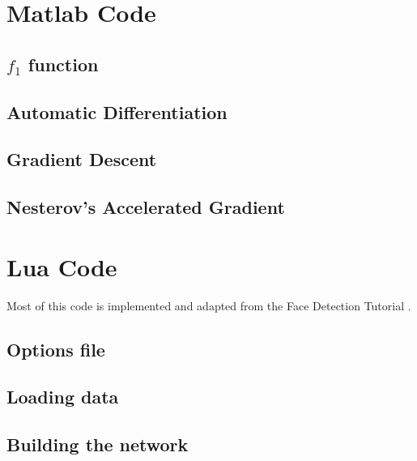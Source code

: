 \documentclass[titlepage]{article}
\theoremstyle{plain}
\theoremstyle{definition}
\begin{document}
	\newpage
	\section{Matlab Code} \label{MatlabCode}
	\lstset{style=matlabStyle}
		\subsection{$f_1$ function} \label{f1code}
		
		\subsection{Automatic Differentiation} \label{AutoDiffCode}
		
		\subsection{Gradient Descent} \label{sgdCode}
		
		\subsection{Nesterov's Accelerated Gradient} \label{nagCode}
		
		\newpage
	\section{Lua Code} \label{luaCode}
	\lstset{style=luaStyle}
	\lstset{inputpath="/home/iosu/workspace/Deep Learning/src/"}
	Most of this code is implemented and adapted from the Face Detection Tutorial \cite{torchCodeSource}.
		\subsection{Options file} \label{luaOpt}
		
		\subsection{Loading data} \label{luaData}
		
		\subsection{Building the network} \label{luaModel}
		
\end{document}
